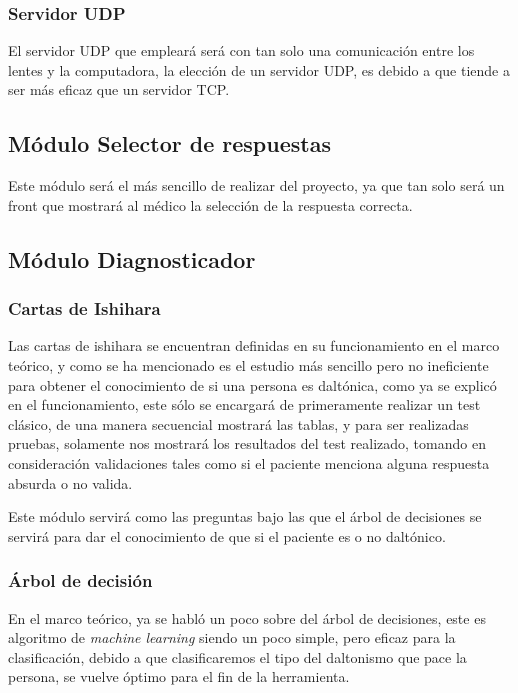 \documentclass[10pt]{article}
\begin{document}
\subsubsection{Servidor UDP}

El servidor UDP que empleará será con tan solo una comunicación entre los lentes y la computadora, la elección de un servidor UDP, es debido a que tiende a ser más eficaz que un servidor TCP.

\subsection{Módulo Selector de respuestas}

Este módulo será el más sencillo de realizar del proyecto, ya que tan solo será un front que mostrará al médico la selección de la respuesta correcta.

\subsection{Módulo Diagnosticador}
\subsubsection{Cartas de Ishihara}
Las cartas de ishihara se encuentran definidas en su funcionamiento en el marco teórico, y como se ha mencionado es el estudio más sencillo pero no ineficiente para obtener el conocimiento de si una persona es daltónica, como ya se explicó en el funcionamiento, este sólo se encargará de primeramente realizar un test clásico, de una manera secuencial mostrará las tablas, y para ser realizadas pruebas, solamente nos mostrará los resultados del test realizado, tomando en consideración validaciones tales como si el paciente menciona alguna respuesta absurda o no valida.

Este módulo servirá como las preguntas bajo las que el árbol de decisiones se servirá para dar el conocimiento de que si el paciente es o no daltónico.

\subsubsection{Árbol de decisión}
En el marco teórico, ya se habló un poco sobre del árbol de decisiones, este es algoritmo de  \textit{machine learning} siendo un poco simple, pero eficaz para la clasificación, debido a que clasificaremos el tipo del daltonismo que pace la persona, se vuelve óptimo para el fin de la herramienta.
\end{document}
